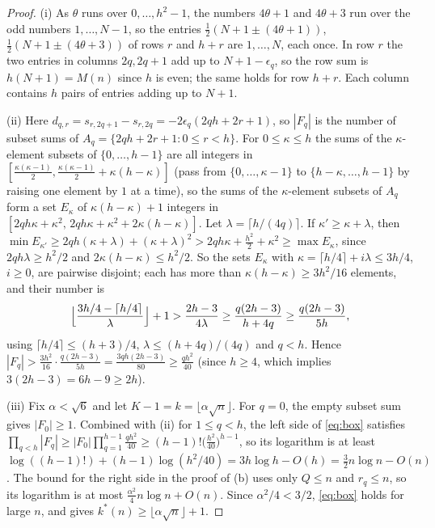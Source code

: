 \begin{proof}
(i) As $\theta$ runs over $0,\dots,h^2-1$, the numbers $4\theta+1$ and $4\theta+3$ run over the odd numbers $1,\dots,N-1$, so the entries $\frac12(N+1\pm(4\theta+1))$, $\frac12(N+1\pm(4\theta+3))$ of rows $r$ and $h+r$ are $1,\dots,N$, each once.
In row $r$ the two entries in columns $2q,2q+1$ add up to $N+1-\epsilon_q$, so the row sum is $h(N+1)=M(n)$ since $h$ is even; the same holds for row $h+r$.
Each column contains $h$ pairs of entries adding up to $N+1$.

(ii) Here $d_{q,r}=s_{r,2q+1}-s_{r,2q}=-2\epsilon_q(2qh+2r+1)$, so $|F_q|$ is the number of subset sums of $A_q=\{2qh+2r+1:0\le r<h\}$.
For $0\le\kappa\le h$ the sums of the $\kappa$-element subsets of $\{0,\dots,h-1\}$ are all integers in $[\frac{\kappa(\kappa-1)}2,\frac{\kappa(\kappa-1)}2+\kappa(h-\kappa)]$ (pass from $\{0,\dots,\kappa-1\}$ to $\{h-\kappa,\dots,h-1\}$ by raising one element by $1$ at a time), so the sums of the $\kappa$-element subsets of $A_q$ form a set $E_\kappa$ of $\kappa(h-\kappa)+1$ integers in $[2qh\kappa+\kappa^2,\,2qh\kappa+\kappa^2+2\kappa(h-\kappa)]$.
Let $\lambda=\lceil h/(4q)\rceil$.
If $\kappa'\ge\kappa+\lambda$, then $\min E_{\kappa'}\ge2qh(\kappa+\lambda)+(\kappa+\lambda)^2>2qh\kappa+\frac{h^2}2+\kappa^2\ge\max E_\kappa$, since $2qh\lambda\ge h^2/2$ and $2\kappa(h-\kappa)\le h^2/2$.
So the sets $E_\kappa$ with $\kappa=\lceil h/4\rceil+i\lambda\le 3h/4$, $i\ge0$, are pairwise disjoint; each has more than $\kappa(h-\kappa)\ge3h^2/16$ elements, and their number is
\[
\Bigl\lfloor\frac{3h/4-\lceil h/4\rceil}{\lambda}\Bigr\rfloor+1>\frac{2h-3}{4\lambda}\ge\frac{q(2h-3)}{h+4q}\ge\frac{q(2h-3)}{5h},
\]
using $\lceil h/4\rceil\le(h+3)/4$, $\lambda\le(h+4q)/(4q)$ and $q<h$.
Hence $|F_q|>\frac{3h^2}{16}\cdot\frac{q(2h-3)}{5h}=\frac{3qh(2h-3)}{80}\ge\frac{qh^2}{40}$ (since $h\ge 4$, which implies $3(2h-3)=6h-9\ge 2h$).

(iii) Fix $\alpha<\sqrt6$ and let $K-1=k=\lfloor\alpha\sqrt n\rfloor$.
For $q=0$, the empty subset sum gives $|F_0|\ge 1$. Combined with (ii) for $1\le q<h$, the left side of \eqref{eq:box} satisfies $\prod_{q<h}|F_q|\ge |F_0|\prod_{q=1}^{h-1}\frac{qh^2}{40}\ge(h-1)!\bigl(\frac{h^2}{40}\bigr)^{h-1}$, so its logarithm is at least $\log((h-1)!)+(h-1)\log(h^2/40)=3h\log h-O(h)=\frac32n\log n-O(n)$.
The bound for the right side in the proof of (b) uses only $Q\le n$ and $r_q\le n$, so its logarithm is at most $\frac{\alpha^2}4n\log n+O(n)$.
Since $\alpha^2/4<3/2$, \eqref{eq:box} holds for large $n$, and  gives $k^*(n)\ge\lfloor\alpha\sqrt n\rfloor+1$.
\end{proof}

